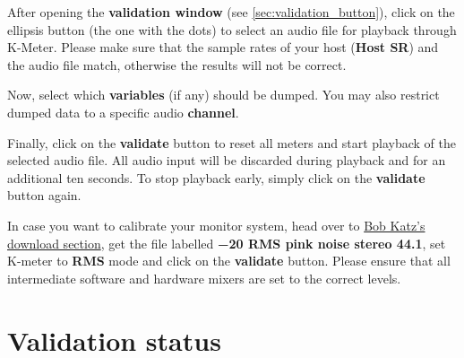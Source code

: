 After opening the \textbf{validation window} (see
\ref{sec:validation_button}), click on the ellipsis button (the one
with the dots) to select an audio file for playback through K-Meter.
Please make sure that the sample rates of your host (\textbf{Host SR})
and the audio file match, otherwise the results will not be correct.

Now, select which \textbf{variables} (if any) should be dumped.  You
may also restrict dumped data to a specific audio \textbf{channel}.

Finally, click on the \textbf{validate} button to reset all meters and
start playback of the selected audio file.  All audio input will be
discarded during playback and for an additional ten seconds.  To stop
playback early, simply click on the \textbf{validate} button again.

In case you want to calibrate your monitor system, head over to
\href{http://www.digido.com/media/downloads.html}{Bob Katz's download
  section}, get the file labelled \textbf{\SI{-20}{\dBFS} RMS pink
  noise stereo \num{44.1}}, set K-meter to \textbf{RMS} mode and click
on the \textbf{validate} button.  Please ensure that all intermediate
software and hardware mixers are set to the correct levels.

\section{Validation status}

